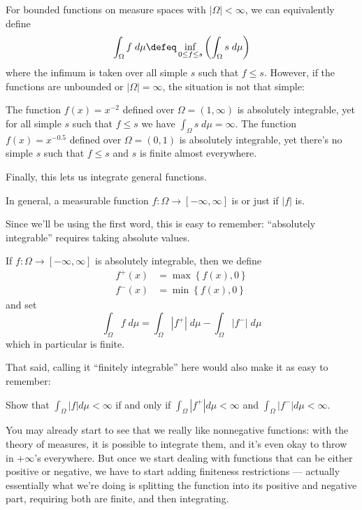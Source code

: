 \begin{remark}
	For bounded functions on measure spaces with $|\Omega| < \infty$, we can equivalently define
	\[ \int_\Omega f \; d\mu \defeq
		\inf_{0 \le f \le s} \left( \int_\Omega s \; d\mu \right) \]
	where the infimum is taken over all simple $s$ such that $f \leq s$.
	However, if the functions are unbounded or $|\Omega| = \infty$, the situation is not that
	simple:
	\begin{itemize}
		\ii The function $f(x) = x^{-2}$ defined over $\Omega = (1, \infty)$ is absolutely integrable,
		yet for all simple $s$ such that $f \leq s$ we have $\int_\Omega s \; d\mu = \infty$.
		\ii The function $f(x) = x^{-0.5}$ defined over $\Omega = (0, 1)$ is absolutely integrable,
		yet there's no simple $s$ such that $f \leq s$ and $s$ is finite almost everywhere.
	\end{itemize}
\end{remark}

Finally, this lets us integrate general functions.
\begin{definition}
	In general, a measurable function $f \colon \Omega \to [-\infty, \infty]$
	is  or just  if $|f|$ is.
\end{definition}
Since we'll be using the first word, this is easy to remember:
``absolutely integrable'' requires taking absolute values.

\begin{step}
	If $f \colon \Omega \to [-\infty, \infty]$ is absolutely integrable,
	then we define
	\begin{align*}
		f^+(x) &= \max\left\{ f(x), 0 \right\} \\
		f^-(x) &= \min\left\{ f(x), 0 \right\}
	\end{align*}
	and set
	\[ \int_\Omega f \; d\mu = \int_\Omega |f^+| \; d\mu
		- \int_\Omega |f^-| \; d\mu \]
	which in particular is finite.
\end{step}

That said, calling it ``finitely integrable'' here would also make it as easy to remember:
\begin{exercise}
	Show that $\int_\Omega |f| d\mu < \infty$ if and only if
	$\int_\Omega |f^+| d\mu < \infty$ and
	$\int_\Omega |f^-| d\mu < \infty$.
\end{exercise}

You may already start to see that we really like nonnegative functions:
with the theory of measures, it is possible to integrate them,
and it's even okay to throw in $+\infty$'s everywhere.
But once we start dealing with functions that can be either positive or negative,
we have to start adding finiteness restrictions ---
actually essentially what we're doing is splitting
the function into its positive and negative part,
requiring both are finite, and then integrating.


